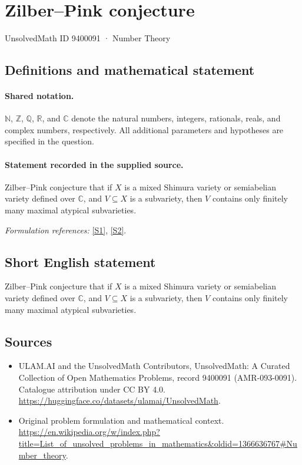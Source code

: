 \documentclass[11pt]{article}
\newcommand{\sref}[2]{\hyperlink{source:#1:#2}{[S#2]}}
\begin{document}
\setcounter{section}{9400090}
\section{Zilber–Pink conjecture}\label{9400091}
{\small UnsolvedMath ID 9400091 · Number Theory}
\subsection{Definitions and mathematical statement}

\paragraph{Shared notation.}$\mathbb N$, $\mathbb Z$, $\mathbb Q$, $\mathbb R$, and $\mathbb C$ denote the natural numbers, integers, rationals, reals, and complex numbers, respectively. All additional parameters and hypotheses are specified in the question.


\paragraph{Statement recorded in the supplied source.}
Zilber–Pink conjecture that if $X$ is a mixed Shimura variety or semiabelian variety defined over $\mathbb{C}$, and $V \subseteq X$ is a subvariety, then $V$ contains only finitely many maximal atypical subvarieties.
\par\smallskip\textit{Formulation references:} \sref{9400091}{1}, \sref{9400091}{2}.
\subsection{Short English statement}
Zilber–Pink conjecture that if $X$ is a mixed Shimura variety or semiabelian variety defined over $\mathbb{C}$, and $V \subseteq X$ is a subvariety, then $V$ contains only finitely many maximal atypical subvarieties.
\subsection{Sources}
\begin{itemize}
\item[\hypertarget{source:9400091:1}{S1}] ULAM.AI and the UnsolvedMath Contributors, UnsolvedMath: A Curated Collection of Open Mathematics Problems, record 9400091 (AMR-093-0091). Catalogue attribution under CC BY 4.0.
\url{https://huggingface.co/datasets/ulamai/UnsolvedMath}.
\item[\hypertarget{source:9400091:2}{S2}] Original problem formulation and mathematical context.
\url{https://en.wikipedia.org/w/index.php?title=List_of_unsolved_problems_in_mathematics&oldid=1366636767#Number_theory}.
\end{itemize}
\label{end:9400091}
\end{document}

